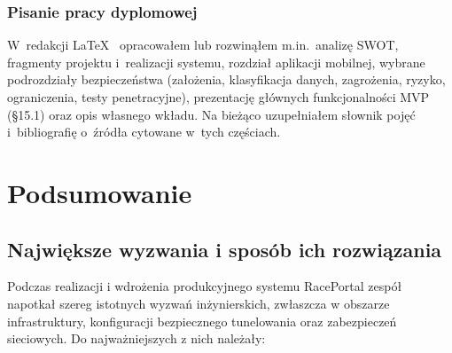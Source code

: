 \documentclass{sprz}
\begin{document}
\subsection{Pisanie pracy dyplomowej}
W~redakcji LaTeX~\cite{latex:project} opracowałem lub rozwinąłem m.in.\ analizę SWOT, fragmenty projektu i~realizacji systemu, rozdział aplikacji mobilnej, wybrane podrozdziały bezpieczeństwa (założenia, klasyfikacja danych, zagrożenia, ryzyko, ograniczenia, testy penetracyjne), prezentację głównych funkcjonalności MVP (§15.1) oraz opis własnego wkładu. Na bieżąco uzupełniałem słownik pojęć i~bibliografię o~źródła cytowane w~tych częściach.

\chapter{Podsumowanie}
\label{ch:podsumowanie}
\section{Największe wyzwania i sposób ich rozwiązania}
Podczas realizacji i wdrożenia produkcyjnego systemu RacePortal zespół napotkał szereg istotnych wyzwań inżynierskich, zwłaszcza w obszarze infrastruktury, konfiguracji bezpiecznego tunelowania oraz zabezpieczeń sieciowych. Do najważniejszych z nich należały:
\end{document}
